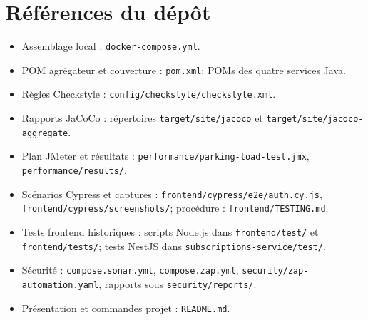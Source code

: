 \documentclass[11pt,a4paper]{report}
\begin{document}
\chapter{Références du dépôt}
\begin{itemize}[leftmargin=*]
  \item Assemblage local : \texttt{docker-compose.yml}.
  \item POM agrégateur et couverture : \texttt{pom.xml}; POMs des quatre services Java.
  \item Règles Checkstyle : \texttt{config/checkstyle/checkstyle.xml}.
  \item Rapports JaCoCo : répertoires \texttt{target/site/jacoco} et \texttt{target/site/jacoco-aggregate}.
  \item Plan JMeter et résultats : \texttt{performance/parking-load-test.jmx}, \texttt{performance/results/}.
  \item Scénarios Cypress et captures : \texttt{frontend/cypress/e2e/auth.cy.js}, \texttt{frontend/cypress/screenshots/}; procédure : \texttt{frontend/TESTING.md}.
  \item Tests frontend historiques : scripts Node.js dans \texttt{frontend/test/} et \texttt{frontend/tests/}; tests NestJS dans \texttt{subscriptions-service/test/}.
  \item Sécurité : \texttt{compose.sonar.yml}, \texttt{compose.zap.yml}, \texttt{security/zap-automation.yaml}, rapports sous \texttt{security/reports/}.
  \item Présentation et commandes projet : \texttt{README.md}.
\end{itemize}
\end{document}
